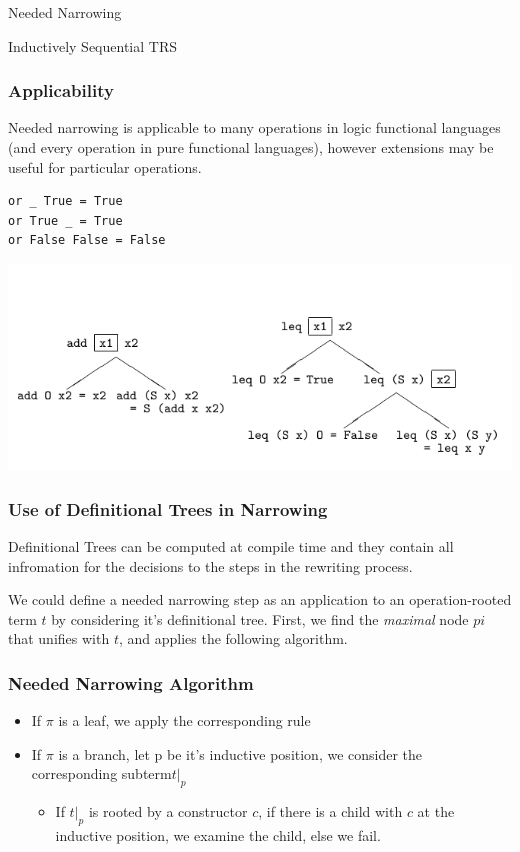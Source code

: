 \documentclass{beamer}
\begin{document}
\begin{section}{Needed Narrowing}
\begin{subsection}{Inductively Sequential TRS}
\begin{frame}
[fragile]

\frametitle{Applicability}
Needed narrowing is applicable to many operations in logic functional languages (and every operation in pure functional languages), however extensions may be useful for particular operations.

\begin{example}
\begin{verbatim}
or _ True = True
or True _ = True
or False False = False
\end{verbatim}
\end{example}
\end{frame}

\begin{frame}

\includegraphics[scale=0.5]{pictures/def_trees.png}
  
\end{frame}

\begin{frame}
\frametitle{Use of Definitional Trees in Narrowing}

  Definitional Trees can be computed at compile time and they contain all infromation for the decisions to the steps in the rewriting process.

  We could define a needed narrowing step as an application to an operation-rooted term $t$ by considering it's definitional tree. First, we find the \textit{maximal} node $pi$ that unifies with $t$, and applies the following algorithm.

\end{frame}

\begin{frame}
\frametitle{Needed Narrowing Algorithm}
  \begin{itemize}
\item If $\pi$ is a leaf, we apply the corresponding rule
\item If $\pi$ is a branch, let p be it's inductive position, we consider the corresponding subterm$t|_p$
  \begin{itemize}
  \item If $t|_p$ is rooted by a constructor $c$, if there is a child  with $c$ at the inductive position, we examine the child, else we fail.


\end{itemize}
\end{itemize}
\end{frame}
\end{subsection}
\end{section}
\end{document}
